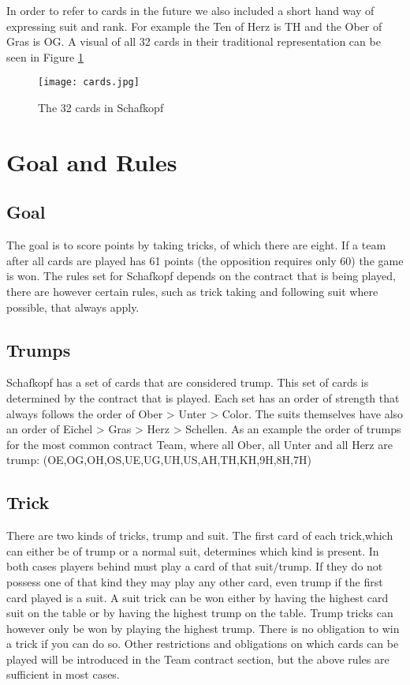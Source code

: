 \newline
In order to refer to cards in the future we also included a short hand way of expressing suit and rank.
For example the Ten of Herz is TH and the Ober of Gras is OG.
A visual of all 32 cards in their traditional representation can be seen in Figure \ref{fig:32cards}
\begin{figure}[h!]
    \centering
    \texttt{[image: cards.jpg]}
    \caption{The 32 cards in Schafkopf}
    \label{fig:32cards}
\end{figure}


\section{Goal and Rules}

\subsection{Goal}
The goal is to score points by taking tricks, of which there are eight.
If a team after all cards are played has 61 points (the opposition requires only 60) the game is won.
The rules set for Schafkopf depends on the contract that is being played, there are however certain rules, such as
trick taking and following suit where possible, that always apply.

\subsection{Trumps}
Schafkopf has a set of cards that are considered trump.
This set of cards is determined by the contract that is played.
\newline
Each set has an order of strength that always follows the order of Ober > Unter > Color.
The suits themselves have also an order of Eichel > Gras > Herz > Schellen.
As an example the order of trumps for the most common contract Team, where all Ober, all Unter and all Herz are trump:
\newline
(OE,OG,OH,OS,UE,UG,UH,US,AH,TH,KH,9H,8H,7H)

\subsection{Trick}
There are two kinds of tricks, trump and suit.
The first card of each trick,which can either be of trump or a normal suit, determines which kind is present.
In both cases players behind must play a card of that suit/trump.
If they do not possess one of that kind they may play any other card, even trump if the first card played is a suit.
\newline
A suit trick can be won either by having the highest card suit on the table or by having the highest trump on the table.
Trump tricks can however only be won by playing the highest trump.
There is no obligation to win a trick if you can do so.
Other restrictions and obligations on which cards can be played will be introduced in the Team contract section,
but the above rules are sufficient in most cases.


